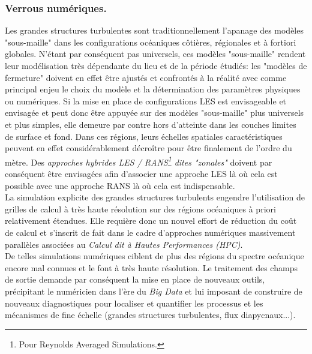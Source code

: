 \subsubsection{Verrous numériques.}
Les grandes structures turbulentes sont traditionnellement l'apanage des modèles "sous-maille" dans les configurations océaniques côtières, régionales et à fortiori globales. N'étant par conséquent pas universels, ces modèles "sous-maille" rendent leur modélisation très dépendante du lieu et de la période étudiés: les "modèles de fermeture" doivent en effet être ajustés et confrontés à la réalité avec comme principal enjeu le choix du modèle et la détermination des paramètres physiques ou numériques. Si la mise en place de configurations LES est envisageable et envisagée et peut donc être appuyée sur des modèles "sous-maille" plus universels et plus simples, elle demeure par contre hors d’atteinte dans les couches limites de surface et fond. Dans ces régions, leurs échelles spatiales caractéristiques peuvent en effet considérablement décroître pour être finalement de l'ordre du mètre. Des \textit{approches hybrides LES / RANS\footnote{Pour Reynolds Averaged Simulations.} dites "zonales"} \citep{friess_modelisation_2010} doivent par conséquent être envisagées afin d'associer une approche LES là où cela est possible avec une approche RANS là où cela est indispensable.\\
La simulation explicite des grandes structures turbulents engendre l'utilisation de grilles de calcul à très haute résolution sur des régions océaniques à priori relativement étendues. Elle requière donc un nouvel effort de réduction du coût de calcul et s'inscrit de fait dans le cadre d'approches numériques massivement parallèles associées au \textit{Calcul dit à Hautes Performances (HPC)}.\\
\color{green}
De telles simulations numériques ciblent de plus des régions du spectre océanique encore mal connues et le font à très haute résolution. Le traitement des champs de sortie demande par conséquent la mise en place de nouveaux outils, précipitant le numéricien dans l'ère du \textit{Big Data} et lui imposant de construire de nouveaux diagnostiques pour localiser et quantifier les processus et les mécanismes de fine échelle (grandes structures turbulentes, flux diapycnaux...).

\color{black}
